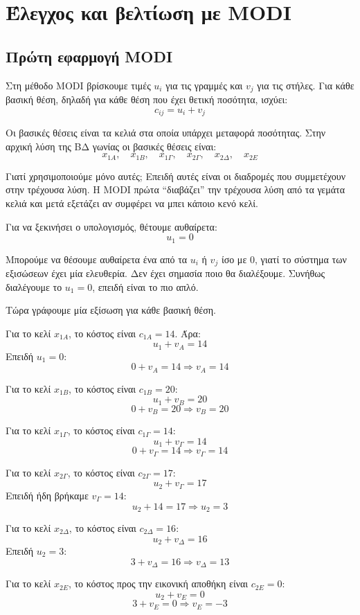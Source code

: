 \documentclass[12pt,a4paper]{article}
\begin{document}
\section{Έλεγχος και βελτίωση με MODI}

\subsection{Πρώτη εφαρμογή MODI}

Στη μέθοδο MODI βρίσκουμε τιμές \(u_i\) για τις γραμμές και \(v_j\) για τις στήλες. Για κάθε βασική θέση, δηλαδή για κάθε θέση που έχει θετική ποσότητα, ισχύει:
\[
c_{ij}=u_i+v_j
\]

Οι βασικές θέσεις είναι τα κελιά στα οποία υπάρχει μεταφορά ποσότητας. Στην αρχική λύση της ΒΔ γωνίας οι βασικές θέσεις είναι:
\[
x_{1A},\quad x_{1B},\quad x_{1\Gamma},\quad x_{2\Gamma},\quad x_{2\Delta},\quad x_{2E}
\]

Γιατί χρησιμοποιούμε μόνο αυτές; Επειδή αυτές είναι οι διαδρομές που συμμετέχουν στην τρέχουσα λύση. Η MODI πρώτα ``διαβάζει'' την τρέχουσα λύση από τα γεμάτα κελιά και μετά εξετάζει αν συμφέρει να μπει κάποιο κενό κελί.

Για να ξεκινήσει ο υπολογισμός, θέτουμε αυθαίρετα:
\[
u_1=0
\]

Μπορούμε να θέσουμε αυθαίρετα ένα από τα \(u_i\) ή \(v_j\) ίσο με 0, γιατί το σύστημα των εξισώσεων έχει μία ελευθερία. Δεν έχει σημασία ποιο θα διαλέξουμε. Συνήθως διαλέγουμε το \(u_1=0\), επειδή είναι το πιο απλό.

Τώρα γράφουμε μία εξίσωση για κάθε βασική θέση.

Για το κελί \(x_{1A}\), το κόστος είναι \(c_{1A}=14\). Άρα:
\[
u_1+v_A=14
\]
Επειδή \(u_1=0\):
\[
0+v_A=14 \Rightarrow v_A=14
\]

Για το κελί \(x_{1B}\), το κόστος είναι \(c_{1B}=20\):
\[
u_1+v_B=20
\]
\[
0+v_B=20 \Rightarrow v_B=20
\]

Για το κελί \(x_{1\Gamma}\), το κόστος είναι \(c_{1\Gamma}=14\):
\[
u_1+v_\Gamma=14
\]
\[
0+v_\Gamma=14 \Rightarrow v_\Gamma=14
\]

Για το κελί \(x_{2\Gamma}\), το κόστος είναι \(c_{2\Gamma}=17\):
\[
u_2+v_\Gamma=17
\]
Επειδή ήδη βρήκαμε \(v_\Gamma=14\):
\[
u_2+14=17 \Rightarrow u_2=3
\]

Για το κελί \(x_{2\Delta}\), το κόστος είναι \(c_{2\Delta}=16\):
\[
u_2+v_\Delta=16
\]
Επειδή \(u_2=3\):
\[
3+v_\Delta=16 \Rightarrow v_\Delta=13
\]

Για το κελί \(x_{2E}\), το κόστος προς την εικονική αποθήκη είναι \(c_{2E}=0\):
\[
u_2+v_E=0
\]
\[
3+v_E=0 \Rightarrow v_E=-3
\]
\end{document}
